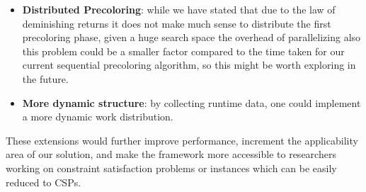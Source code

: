 \begin{itemize}
    \item \textbf{Distributed Precoloring}: while we have stated that due to the law of deminishing returns it does not make much sense to distribute the first precoloring phase, given a huge search space the overhead of parallelizing also this problem could be a smaller factor compared to the time taken for our current sequential precoloring algorithm, so this might be worth exploring in the future.
    \item \textbf{More dynamic structure}: by collecting runtime data, one could implement a more dynamic work distribution.
\end{itemize}

These extensions would further improve performance, increment the applicability area of our solution, and make the framework more accessible to researchers working on constraint satisfaction problems or instances which can be easily reduced to CSPs.